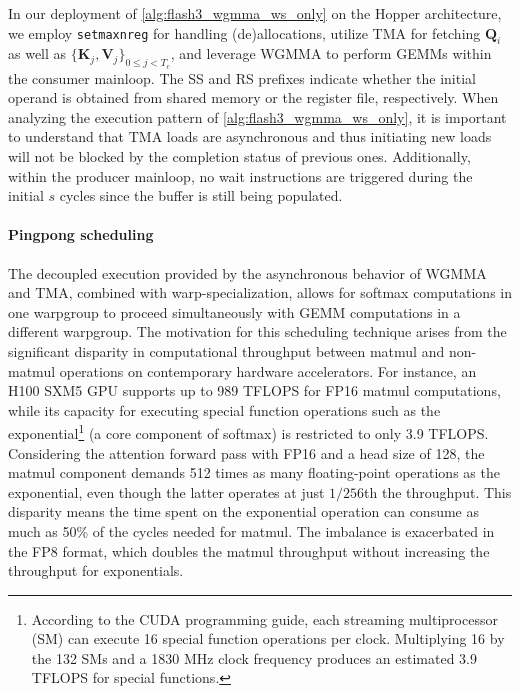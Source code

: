 In our deployment of \cref{alg:flash3_wgmma_ws_only} on the Hopper architecture, we employ \verb|setmaxnreg| for handling (de)allocations, utilize TMA for fetching $\mathbf{Q}_i$ as well as $\{ \mathbf{K}_j, \mathbf{V}_j \}_{0 \leq j < T_c}$, and leverage WGMMA to perform GEMMs within the consumer mainloop. The SS and RS prefixes indicate whether the initial operand is obtained from shared memory or the register file, respectively. When analyzing the execution pattern of \cref{alg:flash3_wgmma_ws_only}, it is important to understand that TMA loads are asynchronous and thus initiating new loads will not be blocked by the completion status of previous ones. Additionally, within the producer mainloop, no wait instructions are triggered during the initial $s$ cycles since the buffer is still being populated.

\paragraph{Pingpong scheduling} The decoupled execution provided by the asynchronous behavior of WGMMA and TMA, combined with warp-specialization, allows for softmax computations in one warpgroup to proceed simultaneously with GEMM computations in a different warpgroup. The motivation for this scheduling technique arises from the significant disparity in computational throughput between matmul and non-matmul operations on contemporary hardware accelerators. For instance, an H100 SXM5 GPU supports up to 989 TFLOPS for FP16 matmul computations, while its capacity for executing special function operations such as the exponential\footnote{According to the CUDA programming guide, each streaming multiprocessor (SM) can execute 16 special function operations per clock. Multiplying 16 by the 132 SMs and a 1830 MHz clock frequency produces an estimated 3.9 TFLOPS for special functions.} (a core component of softmax) is restricted to only 3.9 TFLOPS. Considering the attention forward pass with FP16 and a head size of 128, the matmul component demands 512 times as many floating-point operations as the exponential, even though the latter operates at just $1/256$th the throughput. This disparity means the time spent on the exponential operation can consume as much as 50\% of the cycles needed for matmul. The imbalance is exacerbated in the FP8 format, which doubles the matmul throughput without increasing the throughput for exponentials.

